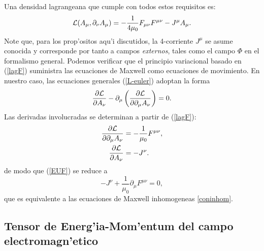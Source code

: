 Una densidad lagrangeana que cumple con todos estos requisitos es:
\begin{equation}
{\cal L}(A_\mu,\partial_\nu A_\mu) =-\frac{1}{4\mu_0}F_{\mu\nu}F^{\mu\nu}-J^\mu A_\mu .\label{lagF}
\end{equation}
Note que, para los prop'ositos aqu'i discutidos, la 4-corriente $J^\mu$ se asume
conocida y corresponde por tanto a campos \textit{externos}, tales como el campo
$\Phi$ en el formalismo general. Podemos verificar que el principio variacional
basado en (\ref{lagF}) suministra las ecuaciones de Maxwell como ecuaciones de
movimiento. En nuestro caso, las ecuaciones generales (\ref{L-euler}) adoptan la
forma
\begin{equation}
\frac{\partial{\cal L}}{\partial A_{\nu}}-\partial_\mu\left(  \frac
{\partial{\cal L}}{\partial\partial_\mu A_{\nu}}\right) =0. \label{EUF}
\end{equation}
Las derivadas involucradas se determinan a partir de (\ref{lagF}):
\begin{align}
\frac{\partial{\cal L}}{\partial\partial_\mu A_{\nu}}  & =-\frac{1}{\mu_0}F^{\mu\nu}, \label{dLdda}\\
\frac{\partial{\cal L}}{\partial A_{\nu}}  & =-J^\nu .
\end{align}
de modo que (\ref{EUF}) se reduce a
\begin{equation}
-J^\nu +\frac{1}{\mu_0}\partial_\mu F^{\mu\nu}=0,
\end{equation}
que es equivalente a las ecuaciones de Maxwell inhomogeneas \eqref{coninhom}.



\subsection{Tensor de Energ'ia-Mom'entum del campo electromagn'etico}

